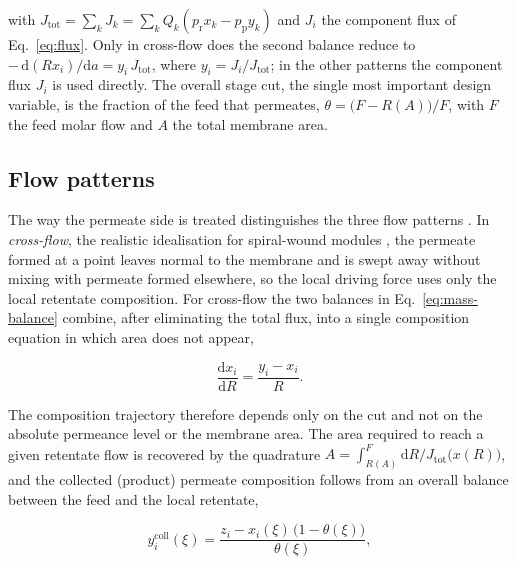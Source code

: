 \documentclass[a4paper,fleqn]{cas-dc}
\begin{document}
with $J_\mathrm{tot} = \sum_k J_k = \sum_k Q_k (p_\mathrm{r} x_k - p_\mathrm{p} y_k)$
and $J_i$ the component flux of Eq.~\eqref{eq:flux}. Only in cross-flow does the
second balance reduce to $-\,\mathrm{d}(R x_i)/\mathrm{d}a = y_i\,J_\mathrm{tot}$,
where $y_i = J_i/J_\mathrm{tot}$; in the other patterns the component flux $J_i$
is used directly. The overall stage cut, the single most important design
variable, is the fraction of the feed that permeates,
$\theta = \bigl(F - R(A)\bigr)/F$, with $F$ the feed molar flow and $A$ the total
membrane area.

\subsection{Flow patterns}\label{sec:model-patterns}
The way the permeate side is treated distinguishes the three flow patterns
\citep{shindo1985,pan1986}. In \emph{cross-flow}, the realistic idealisation for
spiral-wound modules \citep{baker2004,diaspinto2020}, the permeate formed at a point leaves
normal to the membrane and is swept away without mixing with permeate formed
elsewhere, so the local driving force uses only the local retentate composition.
For cross-flow the two balances in Eq.~\eqref{eq:mass-balance} combine, after
eliminating the total flux, into a single composition equation in which area
does not appear,

\begin{equation}\label{eq:cf}
\frac{\mathrm{d}x_i}{\mathrm{d}R} = \frac{y_i - x_i}{R}.
\end{equation}

The composition trajectory therefore depends only on the cut and not on the
absolute permeance level or the membrane area. The area required to reach a given
retentate flow is recovered by the quadrature
$A = \int_{R(A)}^{F} \mathrm{d}R / J_\mathrm{tot}\bigl(x(R)\bigr)$, and the
collected (product) permeate composition follows from an overall balance between
the feed and the local retentate,

\begin{equation}\label{eq:collected}
y_i^{\mathrm{coll}}(\xi) =
\frac{z_i - x_i(\xi)\,\bigl(1 - \theta(\xi)\bigr)}{\theta(\xi)},
\end{equation}
\end{document}
